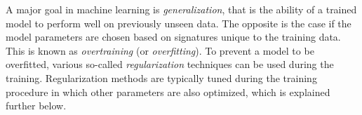 

A major goal in machine learning is \emph{generalization}, that is the ability of a trained model to perform well on previously unseen data.
The opposite is the case if the model parameters are chosen based on signatures unique to the training data. This is known as \emph{overtraining} (or \emph{overfitting}). To prevent a model to be overfitted, various so-called \emph{regularization} techniques can be used during the training.
Regularization methods are typically tuned during the training procedure in which other parameters are also optimized, which is explained further below.


